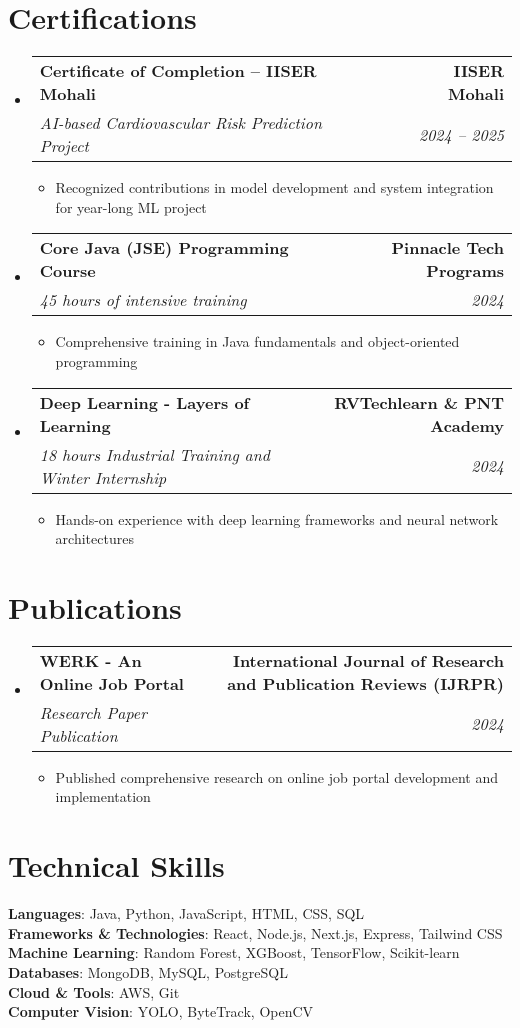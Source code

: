 \documentclass[letterpaper,11pt]{article}
\makeatletter
\newcommand{\resumeItem}[1]{
  \item\small{
    {#1 \vspace{-2pt}}
  }
}
\newcommand{\resumeSubheading}[4]{
  \vspace{-2pt}\item
    \begin{tabular*}{1.0\textwidth}[t]{l@{\extracolsep{\fill}}r}
      \textbf{#1} & \textbf{\small #2} \\
      \textit{\small#3} & \textit{\small #4} \\
    \end{tabular*}\vspace{-7pt}
}
\newcommand{\resumeSubHeadingListStart}{\begin{itemize}[leftmargin=0.0in, label={}]}
\newcommand{\resumeSubHeadingListEnd}{\end{itemize}}
\newcommand{\resumeItemListStart}{\begin{itemize}}
\newcommand{\resumeItemListEnd}{\end{itemize}\vspace{-5pt}}
\makeatother
\begin{document}
\section{Certifications}
    \resumeSubHeadingListStart
      \resumeSubheading
        {Certificate of Completion -- IISER Mohali}{IISER Mohali}
        {AI-based Cardiovascular Risk Prediction Project}{2024 -- 2025}
        \resumeItemListStart
          \resumeItem{Recognized contributions in model development and system integration for year-long ML project}
        \resumeItemListEnd
      \resumeSubheading
        {Core Java (JSE) Programming Course}{Pinnacle Tech Programs}
        {45 hours of intensive training}{2024}
        \resumeItemListStart
          \resumeItem{Comprehensive training in Java fundamentals and object-oriented programming}
        \resumeItemListEnd
      \resumeSubheading
        {Deep Learning - Layers of Learning}{RVTechlearn \& PNT Academy}
        {18 hours Industrial Training and Winter Internship}{2024}
        \resumeItemListStart
          \resumeItem{Hands-on experience with deep learning frameworks and neural network architectures}
        \resumeItemListEnd
    \resumeSubHeadingListEnd

\section{Publications}
    \resumeSubHeadingListStart
      \resumeSubheading
        {WERK - An Online Job Portal}{International Journal of Research and Publication Reviews (IJRPR)}
        {Research Paper Publication}{2024}
        \resumeItemListStart
          \resumeItem{Published comprehensive research on online job portal development and implementation}
        \resumeItemListEnd
    \resumeSubHeadingListEnd

\section{Technical Skills}
 \begin{itemize}[leftmargin=0.15in, label={}]
    \small{\item{
     \textbf{Languages}{: Java, Python, JavaScript, HTML, CSS, SQL} \\
     \textbf{Frameworks \& Technologies}{: React, Node.js, Next.js, Express, Tailwind CSS} \\
     \textbf{Machine Learning}{: Random Forest, XGBoost, TensorFlow, Scikit-learn} \\
     \textbf{Databases}{: MongoDB, MySQL, PostgreSQL} \\
     \textbf{Cloud \& Tools}{: AWS, Git} \\
     \textbf{Computer Vision}{: YOLO, ByteTrack, OpenCV}
    }}
 \end{itemize}
 \vspace{-16pt}
\end{document}
